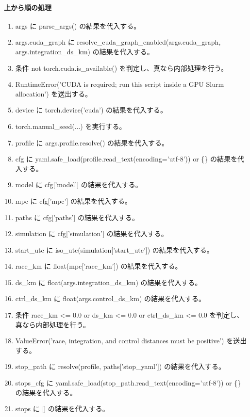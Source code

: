 \documentclass[a4paper,11pt]{article}
\begin{document}
            \paragraph{上から順の処理}
            \begin{enumerate}[leftmargin=1.8em]
            \item args に parse\_args() の結果を代入する。
\item args.cuda\_graph に resolve\_cuda\_graph\_enabled(args.cuda\_graph, args.integration\_ds\_km) の結果を代入する。
\item 条件 not torch.cuda.is\_available() を判定し、真なら内部処理を行う。
\item   RuntimeError('CUDA is required; run this script inside a GPU Slurm allocation') を送出する。
\item device に torch.device('cuda') の結果を代入する。
\item torch.manual\_seed(...) を実行する。
\item profile に args.profile.resolve() の結果を代入する。
\item cfg に yaml.safe\_load(profile.read\_text(encoding='utf-8')) or \{\} の結果を代入する。
\item model に cfg['model'] の結果を代入する。
\item mpc に cfg['mpc'] の結果を代入する。
\item paths に cfg['paths'] の結果を代入する。
\item simulation に cfg['simulation'] の結果を代入する。
\item start\_utc に iso\_utc(simulation['start\_utc']) の結果を代入する。
\item race\_km に float(mpc['race\_km']) の結果を代入する。
\item ds\_km に float(args.integration\_ds\_km) の結果を代入する。
\item ctrl\_ds\_km に float(args.control\_ds\_km) の結果を代入する。
\item 条件 race\_km <= 0.0 or ds\_km <= 0.0 or ctrl\_ds\_km <= 0.0 を判定し、真なら内部処理を行う。
\item   ValueError('race, integration, and control distances must be positive') を送出する。
\item stop\_path に resolve(profile, paths['stop\_yaml']) の結果を代入する。
\item stops\_cfg に yaml.safe\_load(stop\_path.read\_text(encoding='utf-8')) or \{\} の結果を代入する。
\item stops に [] の結果を代入する。

\end{enumerate}
\end{document}
